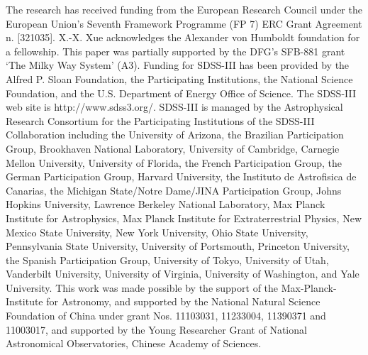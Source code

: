 \documentclass[12pt,preprint]{aastex}
\begin{document}
\acknowledgments
The research has received funding from the European Research Council under the European Union's Seventh Framework Programme (FP 7) ERC Grant Agreement n. [321035].
X.-X. Xue acknowledges the Alexander von Humboldt foundation for a fellowship.
 This paper was partially
supported by the DFG's SFB-881 grant `The Milky Way System' (A3).
Funding for SDSS-III has been provided by the Alfred P. Sloan
Foundation, the Participating Institutions, the National Science
Foundation, and the U.S. Department of Energy Office of Science. The
SDSS-III web site is http://www.sdss3.org/.
SDSS-III is managed by the Astrophysical Research Consortium for the
Participating Institutions of the SDSS-III Collaboration including the
University of Arizona, the Brazilian Participation Group, Brookhaven
National Laboratory, University of Cambridge, Carnegie Mellon
University, University of Florida, the French Participation Group, the
German Participation Group, Harvard University, the Instituto de
Astrofisica de Canarias, the Michigan State/Notre Dame/JINA
Participation Group, Johns Hopkins University, Lawrence Berkeley
National Laboratory, Max Planck Institute for Astrophysics, Max Planck
Institute for Extraterrestrial Physics, New Mexico State University,
New York University, Ohio State University, Pennsylvania State
University, University of Portsmouth, Princeton University, the
Spanish Participation Group, University of Tokyo, University of Utah,
Vanderbilt University, University of Virginia, University of
Washington, and Yale University.
This work was made possible by the support of the Max-Planck-Institute
for Astronomy, and supported by the National Natural Science
Foundation of China under grant Nos. 11103031, 11233004, 11390371 and 11003017,
and supported by the Young Researcher Grant of National Astronomical
Observatories, Chinese Academy of Sciences.


\clearpage
\end{document}
